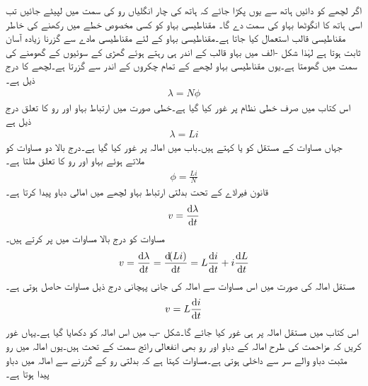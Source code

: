 اگر لچھے کو دائیں ہاتھ سے یوں پکڑا جائے کہ ہاتھ کی چار انگلیاں رو کی سمت میں لپیٹے جائیں تب اسی ہاتھ کا انگوٹھا بہاو کی سمت دے گا۔
مقناطیسی بہاو کو کسی مخصوص خطے میں رکھنے کی خاطر مقناطیسی قالب استعمال کیا جاتا ہے۔مقناطیسی بہاو کے لئے مقناطیسی مادے سے گزرنا زیادہ آسان ثابت ہوتا ہے لہٰذا شکل -الف میں بہاو قالب کے اندر ہی رہتے ہوئے گھڑی کے سوئیوں کے گھومنے  کی سمت میں گھومتا ہے۔یوں مقناطیسی بہاو  لچھے کے تمام چکروں کے اندر سے گزرتا ہے۔لچھے کا   درج ذیل ہے۔
\begin{align}\label{مساوات_مشترک_ارتباط_بہاو_الف}
\lambda=N \phi
\end{align}
اس کتاب میں صرف خطی نظام پر غور کیا گیا ہے۔خطی صورت میں ارتباط بہاو اور رو کا تعلق درج ذیل ہے
\begin{align}\label{مساوات_مشترک_ارتباط_بہاو_ب}
\lambda=L i
\end{align}
جہاں مساوات کے مستقل  کو  یا  کہتے ہیں۔باب  میں امالہ پر غور کیا گیا ہے۔درج بالا دو مساوات کو ملاتے ہوئے  بہاو اور رو کا تعلق ملتا ہے۔
\begin{align}
\phi=\frac{Li}{N}
\end{align}
قانون فیراڈے کے تحت بدلتی ارتباط بہاو لچھے میں امالی دباو پیدا کرتا ہے۔
\begin{align}
v=\frac{\dif \lambda}{\dif t}
\end{align}
مساوات  کو درج بالا مساوات میں پر کرتے ہیں۔
\begin{align*}
v=\frac{\dif \lambda}{\dif t}=\frac{\dif (Li)}{\dif t}=L\frac{\dif i}{\dif t}+i\frac{\dif L}{\dif t}
\end{align*}
مستقل امالہ کی صورت میں اس مساوات سے امالہ کی جانی پہچانی درج ذیل مساوات حاصل ہوتی ہے۔
\begin{align}\label{مساوات_مقناطیسی_امالہ_کی_مساوات}
v=L\frac{\dif i}{\dif t}
\end{align}
اس کتاب میں مستقل امالہ پر ہی غور کیا جائے گا۔شکل -ب میں اس امالہ کو دکھایا گیا ہے۔یہاں غور کریں کہ مزاحمت کی طرح امالہ کے دباو اور رو بھی انفعالی رائج سمت کے تحت ہیں۔یوں امالہ میں رو مثبت دباو والے سر سے داخلی ہوتی ہے۔مساوات  کہتا ہے کہ  بدلتی رو کے گزرنے سے امالہ میں دباو پیدا ہوتا ہے۔
%

